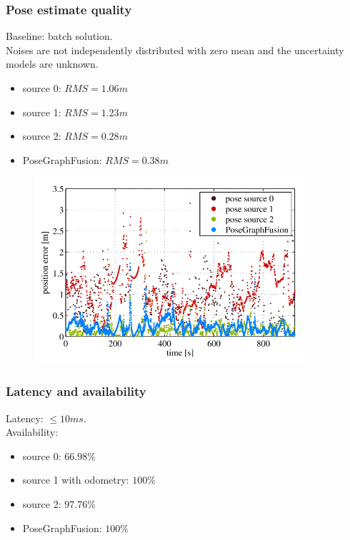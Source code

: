 \documentclass[letterpaper,11pt]{article}
\begin{document}
\subsubsection{Pose estimate quality}
Baseline: batch solution.\\
Noises are not independently distributed with zero mean and the uncertainty models are unknown. 
\begin{itemize}
	\item source 0: $RMS=1.06m$
	\item source 1: $RMS=1.23m$
	\item source 2: $RMS=0.28m$
	\item PoseGraphFusion: $RMS=0.38m$
\end{itemize}
\begin{figure}[!ht]
	\centering
	\includegraphics[width=10cm]{./img/error.png}
\end{figure}

\subsubsection{Latency and availability}
Latency: $\leq 10ms$.\\
Availability:
\begin{itemize}
	\item source 0: $66.98\%$
	\item source 1 with odometry: $100\%$
	\item source 2: $97.76\%$
	\item PoseGraphFusion: $100\%$
\end{itemize}
\end{document}

